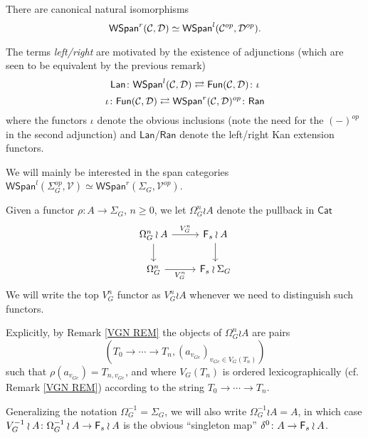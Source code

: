\documentclass[a4paper,10pt]{article}%
\begin{document}
\begin{remark}
There are canonical natural isomorphisms
\[
	\mathsf{WSpan}^r(\mathcal{C},\mathcal{D}) \simeq 
	\mathsf{WSpan}^l(\mathcal{C}^{op},\mathcal{D}^{op}).
\]
\end{remark}


\begin{remark}\label{RANLANADJ REM}
The terms \textit{left/right} are motivated by the existence of adjunctions (which are seen to be equivalent by 
the previous remark)
\[
	\mathsf{Lan} \colon
	\mathsf{WSpan}^l(\mathcal{C}, \mathcal{D})
		\rightleftarrows
	\mathsf{Fun}(\mathcal{C}, \mathcal{D})
	\colon \iota
\]
\[
	\iota \colon 
	\mathsf{Fun}(\mathcal{C}, \mathcal{D})
		\rightleftarrows
	\mathsf{WSpan}^r(\mathcal{C}, \mathcal{D})^{op}
	\colon \mathsf{Ran}
\]
where the functors $\iota$ denote the obvious inclusions 
(note the need for the $(\minus)^{op}$ in the second adjunction) 
and $\mathsf{Lan}$/$\mathsf{Ran}$ denote the left/right Kan extension functors.
\end{remark}



We will mainly be interested in the span categories 
$\mathsf{WSpan}^l(\Sigma_G^{op},\mathcal{V})\simeq 
\mathsf{WSpan}^r(\Sigma_G,\mathcal{V}^{op})$.


\begin{notation}\label{OMEGAGNA NOT}
	Given a functor $\rho \colon A \to \Sigma_G$, $n \geq 0$, we let $\Omega_G^n \wr A$ denote the pullback in $\mathsf{Cat}$
\begin{equation}\label{OMGGNA}
	\begin{tikzcd}
	\Omega_{G}^n \wr A \ar{r}{V_{G}^{n}} \ar{d}& 
	\Fin_s \wr A \ar{d}
\\
	\Omega_{G}^{n} \ar{r}[swap]{V_{G}^{n}} &
	\Fin_s \wr \Sigma_G
	\end{tikzcd}
\end{equation}
We will write the top $V^n_G$ functor as $V_G^n \wr A$ whenever we need to distinguish such functors.

Explicitly, by Remark \ref{VGN REM}
the objects of $\Omega_{G}^{n} \wr A$ are pairs 
\begin{equation}\label{OMEGAGNA EQ}
(T_0 \to \cdots \to T_n,
(a_{v_{G e}})_{v_{G e} \in V_G(T_n)})
\end{equation}
such that $\rho(a_{v_{G e}}) = T_{n,v_{G e}}$, and
where $V_G(T_n)$ is ordered lexicographically
(cf. Remark \ref{VGN REM})
according to the string $T_0 \to \cdots \to T_n$.
\end{notation}

\begin{remark}
	Generalizing the notation $\Omega_{G}^{-1} = \Sigma_G$, we will also write $\Omega_G^{-1} \wr A  = A$, in which case
	$V_{G}^{-1} \wr A \colon \Omega_G^{-1} \wr A \to \mathsf{F}_s \wr A$
	is the obvious ``singleton map'' $\delta^0 \colon A \to \mathsf{F}_s \wr A$.
\end{remark}
\end{document}
